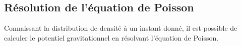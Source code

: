 \subsection{Résolution de l'équation de Poisson}

Connaissant la distribution de densité à un instant donné, il est possible de calculer le potentiel gravitationnel en résolvant l'équation de Poisson.

%
%
%


%
%

